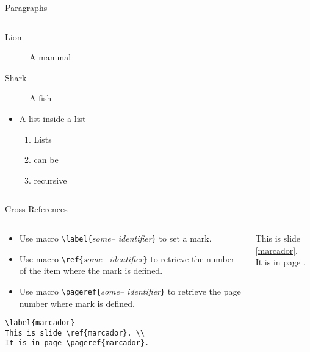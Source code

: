 \begin{frame}[fragile]{Paragraphs}
\begin{columns}
\begin{column}{4cm}
\begin{description}
\item[Lion] A mammal
\item[Shark] A fish
\end{description}
\vspace{0.5cm}
\begin{itemize}
\item A list inside a list
\begin{enumerate}
\item Lists 
\item can be 
\item recursive
\end{enumerate}
\end{itemize}
\end{column}
\end{columns}
\end{frame}

\begin{frame}[fragile]{Cross References}
\begin{columns}
\begin{column}{6cm}
\begin{itemize}
\item Use macro \verb!\label{!\textit{some-- identifier}\verb!}! to set a mark.
\item Use macro \verb!\ref{!\textit{some-- identifier}\verb!}! to retrieve the number of the item where the mark is defined.
\item Use macro \verb!\pageref{!\textit{some-- identifier}\verb!}! to retrieve the page number where mark is defined.
\end{itemize}
\begin{lstlisting}
\label{marcador}
This is slide \ref{marcador}. \\
It is in page \pageref{marcador}.
\end{lstlisting}
\end{column}
\begin{column}{4cm}
\label{marcador}
\begin{center}
This is slide \ref{marcador}. \\
It is in page \pageref{marcador}.
\end{center}
\end{column}
\end{columns}
\end{frame}

